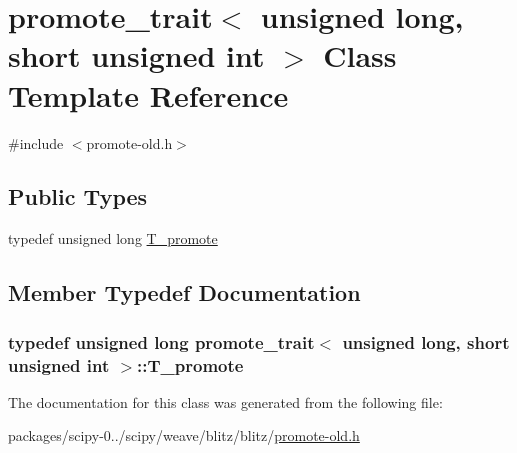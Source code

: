 \hypertarget{classpromote__trait_3_01unsigned_01long_00_01short_01unsigned_01int_01_4}{}\section{promote\+\_\+trait$<$ unsigned long, short unsigned int $>$ Class Template Reference}
\label{classpromote__trait_3_01unsigned_01long_00_01short_01unsigned_01int_01_4}


{\ttfamily \#include $<$promote-\/old.\+h$>$}

\subsection*{Public Types}
\begin{DoxyCompactItemize}
\item 
typedef unsigned long \hyperlink{classpromote__trait_3_01unsigned_01long_00_01short_01unsigned_01int_01_4_a87790388c6843bddd6d24694ead0eb5d}{T\+\_\+promote}
\end{DoxyCompactItemize}


\subsection{Member Typedef Documentation}
\hypertarget{classpromote__trait_3_01unsigned_01long_00_01short_01unsigned_01int_01_4_a87790388c6843bddd6d24694ead0eb5d}{}
\subsubsection[{T\+\_\+promote}]{\setlength{\rightskip}{0pt plus 5cm}typedef unsigned long {\bf promote\+\_\+trait}$<$ unsigned long, short unsigned int $>$\+::{\bf T\+\_\+promote}}\label{classpromote__trait_3_01unsigned_01long_00_01short_01unsigned_01int_01_4_a87790388c6843bddd6d24694ead0eb5d}


The documentation for this class was generated from the following file\+:\begin{DoxyCompactItemize}
\item 
packages/scipy-\/0../scipy/weave/blitz/blitz/\hyperlink{promote-old_8h}{promote-\/old.\+h}\end{DoxyCompactItemize}
